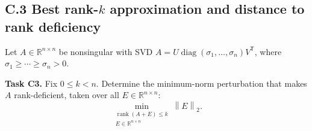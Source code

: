 \documentclass[11pt]{article}
\newcommand{\R}{\mathbb{R}}
\newcommand{\norm}[1]{\left\lVert #1\right\rVert}
\newcommand{\T}{^{\mathsf T}}
\newcommand{\rank}{\operatorname{rank}}
\begin{document}
\subsection*{C.3 Best rank-$k$ approximation and distance to rank deficiency}
Let $A\in\R^{n\times n}$ be nonsingular with SVD
$A=U\operatorname{diag}(\sigma_1,\ldots,\sigma_n)V\T$, where
$\sigma_1\ge\cdots\ge\sigma_n>0$.

\textbf{Task C3.} Fix $0\le k<n$. Determine the minimum-norm perturbation
that makes $A$ rank-deficient, taken over all $E\in\R^{n\times n}$:
\[
 \min_{\substack{\rank(A+E)\le k\\ E\in\R^{n\times n}}}\norm{E}_2. \tag{C.2}
\]
\end{document}
